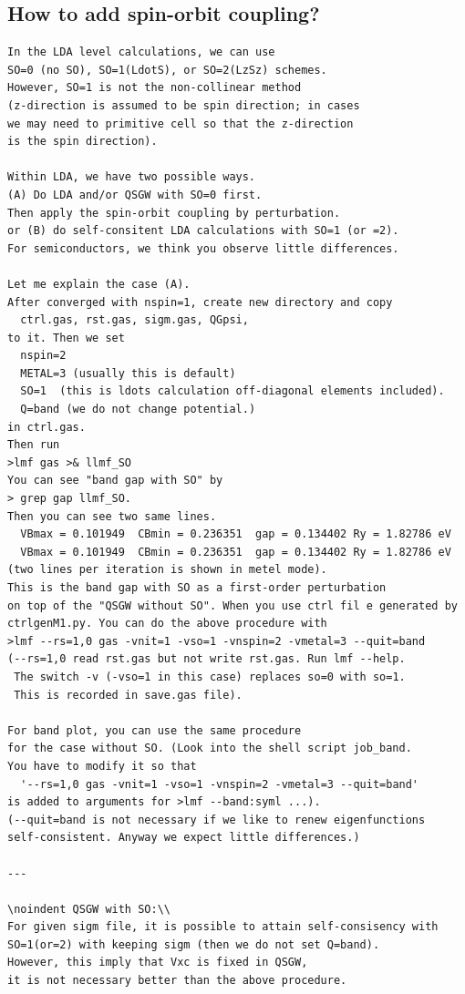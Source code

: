 \documentclass[a4paper,10pt,epsf,fleqn]{article}
\begin{document}
\subsection{How to add spin-orbit coupling?}
\begin{verbatim}
In the LDA level calculations, we can use
SO=0 (no SO), SO=1(LdotS), or SO=2(LzSz) schemes.
However, SO=1 is not the non-collinear method
(z-direction is assumed to be spin direction; in cases
we may need to primitive cell so that the z-direction
is the spin direction).

Within LDA, we have two possible ways.
(A) Do LDA and/or QSGW with SO=0 first.
Then apply the spin-orbit coupling by perturbation.
or (B) do self-consitent LDA calculations with SO=1 (or =2).
For semiconductors, we think you observe little differences.

Let me explain the case (A).
After converged with nspin=1, create new directory and copy
  ctrl.gas, rst.gas, sigm.gas, QGpsi,
to it. Then we set
  nspin=2 
  METAL=3 (usually this is default)
  SO=1  (this is ldots calculation off-diagonal elements included).
  Q=band (we do not change potential.)
in ctrl.gas. 
Then run
>lmf gas >& llmf_SO
You can see "band gap with SO" by 
> grep gap llmf_SO.
Then you can see two same lines.
  VBmax = 0.101949  CBmin = 0.236351  gap = 0.134402 Ry = 1.82786 eV
  VBmax = 0.101949  CBmin = 0.236351  gap = 0.134402 Ry = 1.82786 eV
(two lines per iteration is shown in metel mode).
This is the band gap with SO as a first-order perturbation 
on top of the "QSGW without SO". When you use ctrl fil e generated by
ctrlgenM1.py. You can do the above procedure with
>lmf --rs=1,0 gas -vnit=1 -vso=1 -vnspin=2 -vmetal=3 --quit=band
(--rs=1,0 read rst.gas but not write rst.gas. Run lmf --help.
 The switch -v (-vso=1 in this case) replaces so=0 with so=1. 
 This is recorded in save.gas file).

For band plot, you can use the same procedure 
for the case without SO. (Look into the shell script job_band.
You have to modify it so that 
  '--rs=1,0 gas -vnit=1 -vso=1 -vnspin=2 -vmetal=3 --quit=band' 
is added to arguments for >lmf --band:syml ...).
(--quit=band is not necessary if we like to renew eigenfunctions
self-consistent. Anyway we expect little differences.)

---

\noindent QSGW with SO:\\
For given sigm file, it is possible to attain self-consisency with SO=1(or=2) with keeping sigm (then we do not set Q=band). 
However, this imply that Vxc is fixed in QSGW, 
it is not necessary better than the above procedure.
\end{verbatim}
\end{document}
